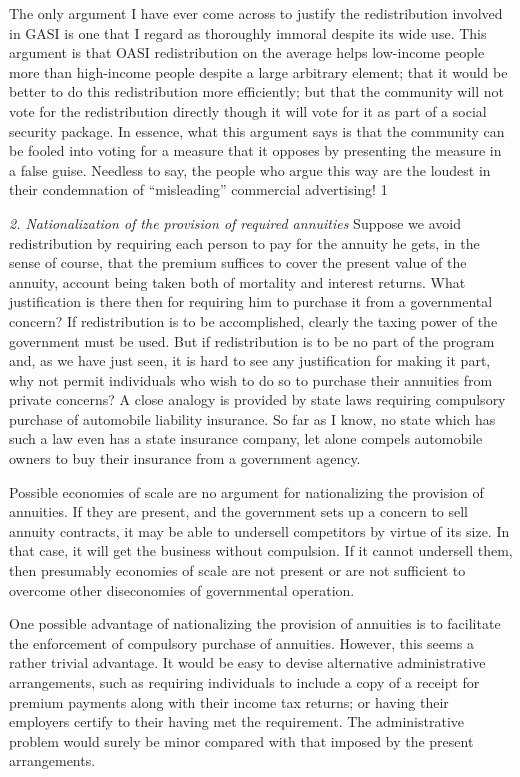 \documentclass[11pt,openany]{book}
\begin{document}
The only argument I have ever come across to justify the redistribution involved in GASI is one that I regard as thoroughly immoral despite its wide use. This argument is that OASI redistribution on the average helps low-income people more than high-income people despite a large arbitrary element; that it would be better to do this redistribution more efficiently; but that the community will not vote for the redistribution directly though it will vote for it as part of a social security package. In essence, what this argument says is that the community can be fooled into voting for a measure that it opposes by presenting the measure in a false guise. Needless to say, the people who argue this way are the loudest in their condemnation of ``misleading'' commercial advertising! 1

\emph{2. Nationalization of the provision of required annuities} Suppose we avoid redistribution by requiring each person to pay for the annuity he gets, in the sense of course, that the premium suffices to cover the present value of the annuity, account being taken both of mortality and interest returns. What justification is there then for requiring him to purchase it from a governmental concern? If redistribution is to be accomplished, clearly the taxing power of the government must be used. But if redistribution is to be no part of the program and, as we have just seen, it is hard to see any justification for making it part, why not permit individuals who wish to do so to purchase their annuities from private concerns? A close analogy is provided by state laws requiring compulsory purchase of automobile liability insurance. So far as I know, no state which has such a law even has a state insurance company, let alone compels automobile owners to buy their insurance from a government agency.

Possible economies of scale are no argument for nationalizing the provision of annuities. If they are present, and the government sets up a concern to sell annuity contracts, it may be able to undersell competitors by virtue of its size. In that case, it will get the business without compulsion. If it cannot undersell them, then presumably economies of scale are not present or are not sufficient to overcome other diseconomies of governmental operation.

One possible advantage of nationalizing the provision of annuities is to facilitate the enforcement of compulsory purchase of annuities. However, this seems a rather trivial advantage. It would be easy to devise alternative administrative arrangements, such as requiring individuals to include a copy of a receipt for premium payments along with their income tax returns; or having their employers certify to their having met the requirement. The administrative problem would surely be minor compared with that imposed by the present arrangements.
\end{document}
